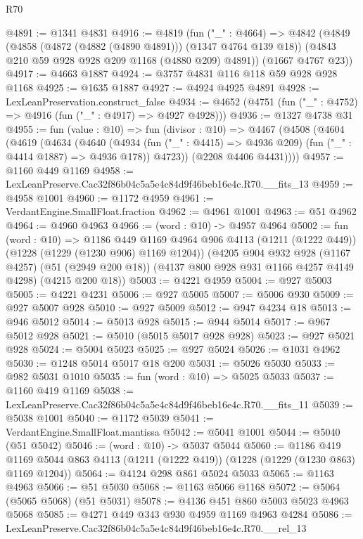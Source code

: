 \begin{lexlean}{R70}
\begin{coremodule}
@4891 := @1341 @4831
@4916 := @4819
    (fun ("_" : @4664) =>
    @4842
      (@4849
        (@4858 (@4872 (@4882 (@4890 @4891))) (@1347 @4764 @139 @18))
        (@4843 @210 @59 @928 @928 @209 @1168 (@4880 @209) @4891))
      (@1667 @4767 @23))
@4917 := @4663 @1887
@4924 := @3757 @4831 @116 @118 @59 @928 @928 @1168
@4925 := @1635 @1887
@4927 := @4924 @4925 @4891
@4928 := LexLeanPreservation.construct_false
@4934 := @4652 (@4751 (fun ("_" : @4752) => @4916 (fun ("_" : @4917) => @4927 @4928)))
@4936 := @1327 @4738 @31
@4955 := fun (value : @10) =>
  fun (divisor : @10) =>
  @4467
    (@4508
      (@4604
        (@4619
          (@4634
            (@4640
              (@4934 (fun ("_" : @4415) => @4936 @209) (fun ("_" : @4414 @1887) => @4936 @178))
              @4723))
          (@2208 @4406 @4431))))
@4957 := @1160 @449 @1169
@4958 := LexLeanPreserve.Cac32f86b04c5a5e4c84d9f46beb16e4c.R70.__fits_13
@4959 := @4958 @1001
@4960 := @1172 @4959
@4961 := VerdantEngine.SmallFloat.fraction
@4962 := @4961 @1001
@4963 := @51 @4962
@4964 := @4960 @4963
@4966 := (word : @10) -> @4957 @4964
@5002 := fun (word : @10) =>
  @1186
    @449
    @1169
    @4964
    @906
    @4113
    (@1211 (@1222 @449))
    (@1228 (@1229 (@1230 @906) @1169 @1204))
    (@4205
      @904
      @932
      @928
      (@1167 @4257)
      (@51 (@2949 @200 @18))
      (@4137 @800 @928 @931 @1166 @4257 @4149 @4298)
      (@4215 @200 @18))
@5003 := @4221 @4959
@5004 := @927 @5003
@5005 := @4221 @4231
@5006 := @927 @5005
@5007 := @5006 @930
@5009 := @927 @5007 @928
@5010 := @927 @5009
@5012 := @947 @4234 @18
@5013 := @946 @5012
@5014 := @5013 @928
@5015 := @944 @5014
@5017 := @967 @5012 @928
@5021 := @5010 (@5015 @5017 @928 @928)
@5023 := @927 @5021 @928
@5024 := @5004 @5023
@5025 := @927 @5024
@5026 := @1031 @4962
@5030 := @1248 @5014 @5017 @18 @200
@5031 := @5026 @5030
@5033 := @982 @5031 @1010
@5035 := fun (word : @10) => @5025 @5033
@5037 := @1160 @419 @1169
@5038 := LexLeanPreserve.Cac32f86b04c5a5e4c84d9f46beb16e4c.R70.__fits_11
@5039 := @5038 @1001
@5040 := @1172 @5039
@5041 := VerdantEngine.SmallFloat.mantissa
@5042 := @5041 @1001
@5044 := @5040 (@51 @5042)
@5046 := (word : @10) -> @5037 @5044
@5060 := @1186
    @419
    @1169
    @5044
    @863
    @4113
    (@1211 (@1222 @419))
    (@1228 (@1229 (@1230 @863) @1169 @1204))
@5064 := @4124 @298 @861 @5024 @5033
@5065 := @1163 @4963
@5066 := @51 @5030
@5068 := @1163 @5066 @1168
@5072 := @5064 (@5065 @5068) (@51 @5031)
@5078 := @4136 @451 @860 @5003 @5023 @4963 @5068
@5085 := @4271 @449 @343 @930 @4959 @1169 @4963 @4284
@5086 := LexLeanPreserve.Cac32f86b04c5a5e4c84d9f46beb16e4c.R70.__rel_13

\end{coremodule}
\end{lexlean}
